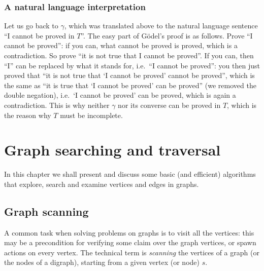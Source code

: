 \documentclass[a4paper]{book}
\theoremstyle{changebreak}                %
\begin{document}
\subsection{A natural language interpretation}
Let us go back to $\gamma$, which was translated above to the natural
language sentence ``I cannot be proved in $T$''. The easy part of
G\"odel's proof is as follows. Prove ``I cannot be proved'': if you
can, what cannot be proved is proved, which is a contradiction. So
prove ``it is not true that I cannot be proved''. If you can, then
``I'' can be replaced by what it stands for, i.e.~``I cannot be
proved'': you then just proved that ``it is not true that `I cannot be
proved' cannot be proved'', which is the same as ``it is true that `I
cannot be proved' can be proved'' (we removed the double negation),
i.e.~`I cannot be proved' can be proved, which is again a
contradiction. This is why neither $\gamma$ nor its converse can be
proved in $T$, which is the reason why $T$ must be incomplete.

\chapter{Graph searching and traversal}
\label{c:graphalg}

\begin{center}
\end{center}


In this chapter we shall present and discuss some basic (and
efficient) algorithms that explore, search and examine vertices and
edges in graphs.

\section{Graph scanning}
\label{s:graphalg:gphscn}
A common task when solving problems on graphs is to visit all the
vertices: this may be a precondition for verifying some claim over the
graph vertices, or spawn actions on every vertex. The technical term
is {\it scanning} the vertices
of a graph (or the nodes of a digraph), starting
from a given vertex (or node) $s$. 
\end{document}
